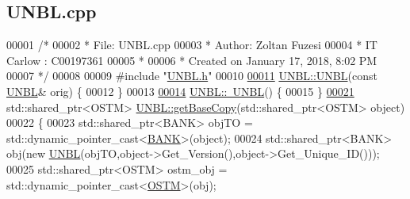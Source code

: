 \hypertarget{_u_n_b_l_8cpp_source}{}\subsection{U\+N\+B\+L.\+cpp}

\begin{DoxyCode}
00001 \textcolor{comment}{/* }
00002 \textcolor{comment}{ * File:   UNBL.cpp}
00003 \textcolor{comment}{ * Author: Zoltan Fuzesi}
00004 \textcolor{comment}{ * IT Carlow : C00197361}
00005 \textcolor{comment}{ *}
00006 \textcolor{comment}{ * Created on January 17, 2018, 8:02 PM}
00007 \textcolor{comment}{ */}
00008 
00009 \textcolor{preprocessor}{#include "\hyperlink{_u_n_b_l_8h}{UNBL.h}"}
00010 
\hypertarget{_u_n_b_l_8cpp_source.tex_l00011}{}\hyperlink{class_u_n_b_l_aca7a99d7308d5d8dd5841a0eeeed0852_aca7a99d7308d5d8dd5841a0eeeed0852}{00011} \hyperlink{class_u_n_b_l_aa264ef64c453e6049b3d4c984d84d1de_aa264ef64c453e6049b3d4c984d84d1de}{UNBL::UNBL}(\textcolor{keyword}{const} \hyperlink{class_u_n_b_l}{UNBL}& orig) \{
00012 \}
00013 
\hypertarget{_u_n_b_l_8cpp_source.tex_l00014}{}\hyperlink{class_u_n_b_l_a32d405e6e9adfab1ffdeec6406f9e72f_a32d405e6e9adfab1ffdeec6406f9e72f}{00014} \hyperlink{class_u_n_b_l_a32d405e6e9adfab1ffdeec6406f9e72f_a32d405e6e9adfab1ffdeec6406f9e72f}{UNBL::~UNBL}() \{
00015 \}
\hypertarget{_u_n_b_l_8cpp_source.tex_l00021}{}\hyperlink{class_u_n_b_l_a5dfe7f9e5fbb66abff9a73e40e803887_a5dfe7f9e5fbb66abff9a73e40e803887}{00021} std::shared\_ptr<OSTM> \hyperlink{class_u_n_b_l_a5dfe7f9e5fbb66abff9a73e40e803887_a5dfe7f9e5fbb66abff9a73e40e803887}{UNBL::getBaseCopy}(std::shared\_ptr<OSTM> \textcolor{keywordtype}{object})
00022 \{
00023     std::shared\_ptr<BANK> objTO = std::dynamic\_pointer\_cast<\hyperlink{class_b_a_n_k}{BANK}>(object);
00024     std::shared\_ptr<BANK> obj(\textcolor{keyword}{new} \hyperlink{class_u_n_b_l_aa264ef64c453e6049b3d4c984d84d1de_aa264ef64c453e6049b3d4c984d84d1de}{UNBL}(objTO,object->Get\_Version(),\textcolor{keywordtype}{object}->Get\_Unique\_ID())); 
00025     std::shared\_ptr<OSTM> ostm\_obj = std::dynamic\_pointer\_cast<\hyperlink{class_o_s_t_m}{OSTM}>(obj);                             
           

\end{DoxyCode}
